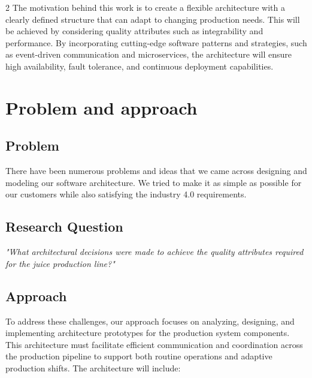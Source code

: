 \documentclass{article}
\begin{document}
\begin{multicols}{2}
The motivation behind this work is to create a flexible architecture with a clearly defined structure that can adapt to changing production needs. This will be achieved by considering quality attributes such as integrability and performance. By incorporating cutting-edge software patterns and strategies, such as event-driven communication and microservices, the architecture will ensure high availability, fault tolerance, and continuous deployment capabilities.

\section{Problem and approach}
\color{blue}
\color{black}

\subsection{Problem}
There have been numerous problems and ideas that we came across designing and modeling our software architecture. We tried to make it as simple as possible for our customers while also satisfying the industry 4.0 requirements. 

\subsection{Research Question}
\label{sec:question}
\begin{center}
\textit{"What architectural decisions were made to achieve the quality attributes required for the juice production line?"}
\end{center}

\subsection{Approach}
To address these challenges, our approach focuses on analyzing, designing, and implementing architecture prototypes for the production system components. This architecture must facilitate efficient communication and coordination across the production pipeline to support both routine operations and adaptive production shifts. The architecture will include:


\end{multicols}
\end{document}
